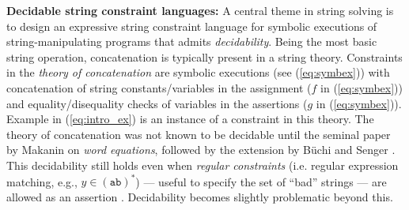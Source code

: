 \smallskip
\noindent
\textbf{Decidable string constraint languages:}
A central theme in string solving is to design an
expressive string constraint language for symbolic executions of 
string-manipulating
programs that admits \emph{decidability}. 
Being the most basic string operation,
concatenation is typically present in a string theory.
Constraints in the \emph{theory of concatenation} 
are symbolic executions (see (\ref{eq:symbex}))
with concatenation of string constants/variables in the
assignment ($f$ in (\ref{eq:symbex})) and equality/disequality checks of
variables in the assertions ($g$ in (\ref{eq:symbex})).
Example in (\ref{eq:intro_ex}) is an instance of a constraint in this theory.
The theory of concatenation was 
not known to be decidable until the seminal
paper by Makanin \cite{Makanin} on \emph{word equations}, followed by the
extension by B\"{u}chi and Senger \cite{buchi}.
This decidability still holds even when
\emph{regular constraints} (i.e. regular expression matching, e.g., 
$y \in (\texttt{ab})^*$) --- useful to specify the set of ``bad'' strings ---
are allowed as an assertion \cite{Schulz}. 
Decidability becomes slightly problematic beyond this.

